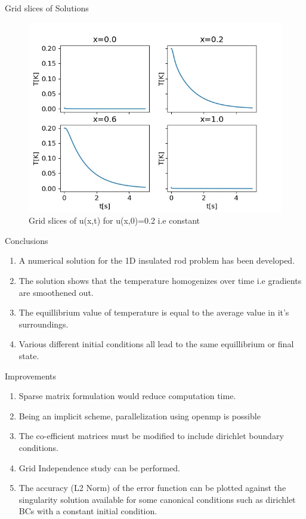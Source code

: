 \documentclass[10pt,compress]{beamer}
\begin{document}
\begin{frame}{Grid slices of Solutions}
\begin{figure}
\begin{center}
	\includegraphics[scale=0.5]{../plots/slice_1_0500_2000.jpg}
	\caption{Grid slices of u(x,t) for u(x,0)=0.2 i.e constant}
	\label{fig:const-slice}
\end{center}
\end{figure}
\end{frame}

\begin{frame}{Conclusions}
\begin{enumerate}
\item A numerical solution for the 1D insulated rod problem has been developed.
\item The solution shows that the temperature homogenizes over time i.e gradients are smoothened out.
\item The equillibrium value of temperature is equal to the average value in it's surroundings.
\item Various different initial conditions all lead to the same equillibrium or final state.
\end{enumerate}
\end{frame}


\begin{frame}{Improvements}
\begin{enumerate}
\item Sparse matrix formulation would reduce computation time.
\item Being an implicit scheme, parallelization using openmp is possible 
\item The co-efficient matrices must be modified to include dirichlet boundary conditions.
\item Grid Independence study can be performed.
\item The accuracy (L2 Norm) of the error function can be plotted against the singularity solution available for some canonical conditions such as dirichlet BCs with a constant initial condition.
\end{enumerate}
\end{frame}
\end{document}
